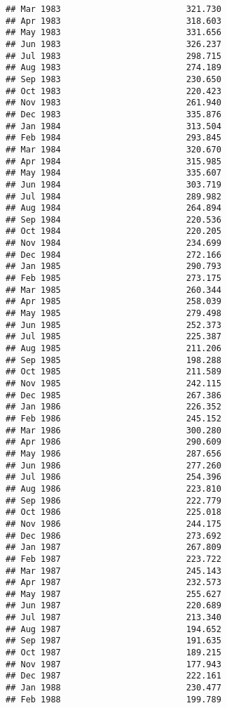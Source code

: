 \documentclass[
]{article}
\begin{document}
\begin{verbatim}
## Mar 1983                         321.730
## Apr 1983                         318.603
## May 1983                         331.656
## Jun 1983                         326.237
## Jul 1983                         298.715
## Aug 1983                         274.189
## Sep 1983                         230.650
## Oct 1983                         220.423
## Nov 1983                         261.940
## Dec 1983                         335.876
## Jan 1984                         313.504
## Feb 1984                         293.845
## Mar 1984                         320.670
## Apr 1984                         315.985
## May 1984                         335.607
## Jun 1984                         303.719
## Jul 1984                         289.982
## Aug 1984                         264.894
## Sep 1984                         220.536
## Oct 1984                         220.205
## Nov 1984                         234.699
## Dec 1984                         272.166
## Jan 1985                         290.793
## Feb 1985                         273.175
## Mar 1985                         260.344
## Apr 1985                         258.039
## May 1985                         279.498
## Jun 1985                         252.373
## Jul 1985                         225.387
## Aug 1985                         211.206
## Sep 1985                         198.288
## Oct 1985                         211.589
## Nov 1985                         242.115
## Dec 1985                         267.386
## Jan 1986                         226.352
## Feb 1986                         245.152
## Mar 1986                         300.280
## Apr 1986                         290.609
## May 1986                         287.656
## Jun 1986                         277.260
## Jul 1986                         254.396
## Aug 1986                         223.810
## Sep 1986                         222.779
## Oct 1986                         225.018
## Nov 1986                         244.175
## Dec 1986                         273.692
## Jan 1987                         267.809
## Feb 1987                         223.722
## Mar 1987                         245.143
## Apr 1987                         232.573
## May 1987                         255.627
## Jun 1987                         220.689
## Jul 1987                         213.340
## Aug 1987                         194.652
## Sep 1987                         191.635
## Oct 1987                         189.215
## Nov 1987                         177.943
## Dec 1987                         222.161
## Jan 1988                         230.477
## Feb 1988                         199.789

\end{verbatim}
\end{document}
